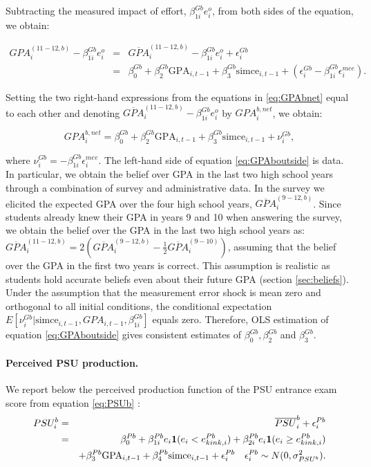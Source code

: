 \noindent Subtracting the measured impact of effort, $\beta^{Gb}_{1i}e_i^{o}$, from both sides of the equation, we obtain:

\begin{eqnarray}\label{eq:GPAbnet}
GPA^{(11-12,b)}_{i}-\beta^{Gb}_{1i}e_i^{o}&=&\overline{GPA}^{(11-12,b)}_{i}-\beta^{Gb}_{1i}e_i^{o}+\epsilon_{i}^{Gb}\\ \nonumber  
&=& \beta^{Gb}_{0}+\beta^{Gb}_{2}\mbox{GPA}_{i,t-1}+\beta^{Gb}_{3} \mbox{simce}_{i,t-1}+(\epsilon_{i}^{Gb}-\beta^{Gb}_{1i}\epsilon_i^{mee}).
\end{eqnarray} 


\noindent Setting the two right-hand expressions from the equations in \eqref{eq:GPAbnet} equal to each other and denoting $\overline{GPA}^{(11-12,b)}_{i}-\beta^{Gb}_{1i}e_i^{o}$ by $GPA_i^{b,net}$, we obtain:

\begin{equation}\label{eq:GPAboutside}
   GPA_i^{b,net}= \beta^{Gb}_{0}+\beta^{Gb}_{2}\mbox{GPA}_{i,t-1}+\beta^{Gb}_{3} \mbox{simce}_{i,t-1}+\nu_i^{Gb},
\end{equation}

\noindent where $\nu_i^{Gb}=-\beta^{Gb}_{1i}\epsilon_i^{mee}$. The left-hand side of equation \eqref{eq:GPAboutside} is data. In particular, we obtain the belief over GPA in the last two high school years through a combination of survey and administrative data. In the survey we elicited the expected GPA over the four high school years, $\overline{GPA}^{(9-12,b)}_{i}$. Since students already knew their GPA in years 9 and 10 when answering the survey, we obtain the belief over the GPA in the last two high school years as: $\overline{GPA}^{(11-12,b)}_{i}=2 \left( \overline{GPA}^{(9-12,b)}_{i}-\frac{1}{2}\overline{GPA}^{(9-10)}_{i} \right)$, assuming that the belief over the GPA in the first two years is correct. This assumption is realistic as students hold accurate beliefs even about their future GPA (section \ref{sec:beliefs}). Under the assumption that the measurement error shock is mean zero and orthogonal to all initial conditions, the conditional expectation $E[\nu_i^{Gb}|\mbox{simce}_{i,t-1},GPA_{i,t-1},\beta^{Gb}_{1i}]$ equals zero. Therefore, OLS estimation of equation \eqref{eq:GPAboutside} gives consistent estimates of $\beta^{Gb}_{0},\beta^{Gb}_{2}$ and $\beta^{Gb}_{3}$.




\paragraph{Perceived PSU production.} We report below the perceived production function of the PSU entrance exam score from equation \eqref{eq:PSUb} :
\begin{eqnarray*} PSU^b_{i}&=&\overline{PSU}^b_{i}+\epsilon_{i}^{Pb}\\ \nonumber   &=& \beta^{Pb}_0+\beta^{Pb}_{1i}e_i {\bf 1}(e_i< e^{Pb}_{kink,i})+\beta^{Pb}_{2i}e_i {\bf 1}(e_i\geq  e^{Pb}_{kink,i}) \\ \nonumber 
&& +\beta^{Pb}_{3}\mbox{GPA}_{i,t-1} +\beta^{Pb}_{4}\mbox{simce}_{i,t-1}+\epsilon_{i}^{Pb} \quad \epsilon_{i}^{Pb} \sim N(0,\sigma^2_{PSU^b}).
\end{eqnarray*} 

